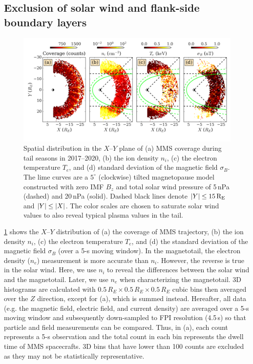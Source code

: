 \documentclass[draft]{agujournal2019}
\begin{document}
\subsection{Exclusion of solar wind and flank-side boundary layers}\label{sec:define_roi}

\begin{figure}
\centering
\noindent\includegraphics[width=\textwidth]{Fig2_inner_tail.pdf}
\caption{
Spatial distribution in the $X$--$Y$ plane of (a) MMS coverage during tail seasons in 2017--2020, (b) the ion density $n_i$, (c) the electron temperature $T_e$, and (d) standard deviation of the magnetic field $\sigma_B$. The lime curves are a $5^\circ$ (clockwise) tilted magnetopause model \cite{Lin2010} constructed with zero IMF $B_z$ and total solar wind pressure of 5\,\si{nPa} (dashed) and 20\,\si{nPa} (solid). Dashed black lines denote ${\abs{Y}\leq 15\,\si{R_E}}$ and ${\abs{Y}\leq\abs{X}}$. The color scales are chosen to saturate solar wind values to also reveal typical plasma values in the tail.
}
\label{fig:tail_roi}
\end{figure}

\cref{fig:tail_roi} shows the $X$--$Y$ distribution of (a) the coverage of MMS trajectory, (b) the ion density $n_i$, (c) the electron temperature $T_e$, and (d) the standard deviation of the magnetic field $\sigma_B$ (over a 5-s moving window). In the magnetotail, the electron density ($n_e$) measurement is more accurate than $n_i$. However, the reverse is true in the solar wind. Here, we use $n_i$ to reveal the differences between the solar wind and the magnetotail. Later, we use $n_e$ when characterizing the magnetotail. 3D histograms are calculated with ${0.5\,\si{R_E}\times0.5\,\si{R_E}\times0.5\,\si{R_E}}$ cubic bins then averaged over the $Z$ direction, except for (a), which is summed instead. Hereafter, all data (e.g. the magnetic field, electric field, and current density) are averaged over a 5-s moving window and subsequently down-sampled to FPI resolution (4.5\,\si{s}) so that particle and field measurements can be compared. Thus, in (a), each count represents a 5-s observation and the total count in each bin represents the dwell time of MMS spacecrafts. 3D bins that have lower than 100 counts are excluded as they may not be statistically representative.
\end{document}

